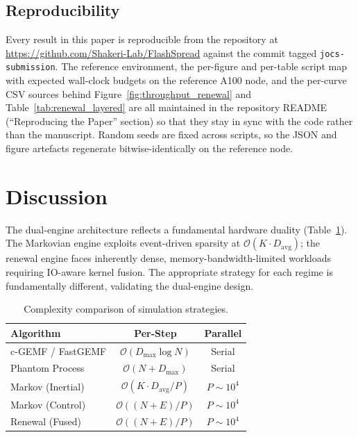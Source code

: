 \documentclass[a4paper,fleqn]{cas-sc}
\theoremstyle{definition}
\theoremstyle{remark}
\newcommand{\bigO}{\mathcal{O}}
\begin{document}
\subsection{Reproducibility}
\label{sec:repro}

Every result in this paper is reproducible from the repository at \url{https://github.com/Shakeri-Lab/FlashSpread} against the commit tagged \texttt{jocs-submission}. The reference environment, the per-figure and per-table script map with expected wall-clock budgets on the reference A100 node, and the per-curve CSV sources behind Figure~\ref{fig:throughput_renewal} and Table~\ref{tab:renewal_layered} are all maintained in the repository README (``Reproducing the Paper'' section) so that they stay in sync with the code rather than the manuscript. Random seeds are fixed across scripts, so the JSON and figure artefacts regenerate bitwise-identically on the reference node.

\section{Discussion}\label{sec:discussion}

The dual-engine architecture reflects a fundamental hardware duality (Table~\ref{tab:complexity}). The Markovian engine exploits event-driven sparsity at $\bigO(K \cdot D_{\mathrm{avg}})$; the renewal engine faces inherently dense, memory-bandwidth-limited workloads requiring IO-aware kernel fusion. The appropriate strategy for each regime is fundamentally different, validating the dual-engine design.

\begin{table}[!h]
\centering
\caption{Complexity comparison of simulation strategies.}
\label{tab:complexity}
\begin{tabular*}{\tblwidth}{@{}lcc@{}}
\toprule
\textbf{Algorithm} & \textbf{Per-Step} & \textbf{Parallel} \\
\midrule
c-GEMF / FastGEMF & $\bigO(D_{\max} \log N)$ & Serial \\
Phantom Process & $\bigO(N + D_{\max})$ & Serial \\
\midrule
Markov (Inertial) & $\bigO(K \cdot D_{\text{avg}} / P)$ & $P \sim 10^4$ \\
Markov (Control) & $\bigO((N + E) / P)$ & $P \sim 10^4$ \\
Renewal (Fused) & $\bigO((N + E) / P)$ & $P \sim 10^4$ \\
\bottomrule
\end{tabular*}
\end{table}
\end{document}
